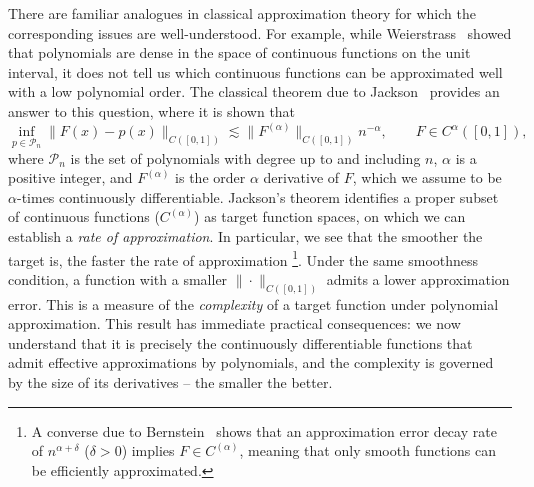 \documentclass[12pt]{amsart}
\numberwithin{equation}{section}
\theoremstyle{remark}
\begin{document}
There are familiar analogues in classical approximation theory
for which the corresponding issues are well-understood.
For example, while Weierstrass~\cite{devore1993constructive} showed that polynomials
are dense in the space of continuous functions on the unit interval,
it does not tell us which continuous functions can be approximated well
with a low polynomial order.
The classical theorem due to Jackson~\cite{devore1993constructive} provides an answer to this question,
where it is shown that
\begin{equation}
    \inf_{p \in \mathcal{P}_n}
    \|F(x) - p(x)\|_{C([0,1])}
    \lesssim
    \| F^{(\alpha)} \|_{C([0,1])} n^{-\alpha},
    \qquad
    F \in C^{\alpha}([0,1]),
\end{equation}
where $\mathcal{P}_n$ is the set of polynomials with degree up to and including $n$,
$\alpha$ is a positive integer, and $F^{(\alpha)}$ is the order $\alpha$ derivative of $F$,
which we assume to be $\alpha$-times continuously differentiable.
Jackson's theorem identifies a proper subset of continuous functions ($C^{(\alpha)}$)
as target function spaces, on which we can establish a \emph{rate of approximation}.
In particular, we see that the smoother the target is, the faster the rate of approximation%
\footnote{A converse due to Bernstein~\cite{devore1993constructive} shows that an approximation error
decay rate of $n^{\alpha + \delta}$ ($\delta > 0$) implies $F \in C^{(\alpha)}$,
meaning that only smooth functions can be efficiently approximated.}.
Under the same smoothness condition, a function with a smaller $\|\cdot \|_{C([0,1])}$
admits a lower approximation error. This is a measure of the \emph{complexity}
of a target function under polynomial approximation.
This result has immediate practical consequences:
we now understand that it is precisely the continuously differentiable functions
that admit effective approximations by polynomials, and the complexity is governed
by the size of its derivatives -- the smaller the better.
\end{document}
